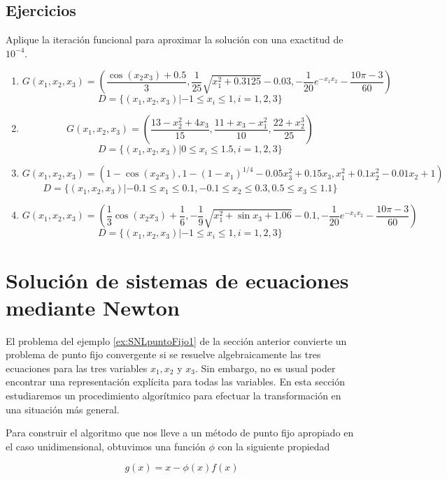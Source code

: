 \subsection*{Ejercicios}
Aplique la iteración funcional para aproximar la solución con una exactitud de $10^{-4}$.
\begin{enumerate}
	\item 
		$$G(x_1,x_2,x_3) = \left(\frac{\cos (x_2x_3) + 0.5}{3}, \frac{1}{25}\sqrt{x_1^2+0.3125}-0.03, -\frac{1}{20}e^{-x_1x_2}-\frac{10\pi-3}{60} \right)$$
		$$D=\{ (x_1,x_2,x_3)| -1\leq x_i\leq 1, i=1,2,3 \}$$
		
	\item
		$$G(x_1,x_2,x_3) = \left( \frac{13-x_2^2+4x_3}{15}, \frac{11+x_3-x_1^2}{10}, \frac{22+x_2^3}{25} \right)$$
		$$D=\{ (x_1,x_2,x_3)| 0\leq x_i\leq 1.5, i=1,2,3 \}$$
			
	\item 
		$$G(x_1,x_2,x_3) = \left(1-\cos(x_2x_3), 1-(1-x_1)^{1/4}-0.05x_3^2+0.15x_3, x_1^2+0.1x_2^2-0.01x_2+1 \right)$$
		$$D=\{ (x_1,x_2,x_3)| -0.1\leq x_1\leq 0.1, -0.1\leq x_2\leq 0.3, 0.5\leq x_3\leq 1.1 \}$$
			
	\item
		$$G(x_1,x_2,x_3) = \left( \frac{1}{3}\cos(x_2x_3) + \frac{1}{6}, -\frac{1}{9}\sqrt{x_1^2+\sin x_3+1.06}-0.1, -\frac{1}{20}e^{-x_1x_2}
			-\frac{10\pi -3}{60} \right)$$
		$$D=\{ (x_1,x_2,x_3)| -1\leq x_i\leq 1, i=1,2,3 \}$$			
\end{enumerate}


\section{Solución de sistemas de ecuaciones mediante Newton}

El problema del ejemplo \ref{ex:SNLpuntoFijo1} de la sección anterior convierte un problema de punto fijo convergente si se resuelve 
algebraicamente las tres ecuaciones para las tres variables $x_1,x_2$ y $x_3$. Sin embargo, no es usual poder encontrar una representación 
explícita para todas las variables. En esta sección estudiaremos un procedimiento algorítmico para efectuar la transformación en una 
situación más general.

Para construir el algoritmo que nos lleve a un método de punto fijo apropiado en el caso unidimensional, obtuvimos una función $\phi$ con 
la siguiente propiedad

\begin{equation*}
	g(x) = x - \phi(x)f(x)
\end{equation*}

